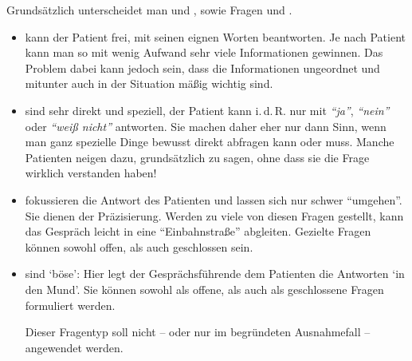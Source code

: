 {
Grundsätzlich unterscheidet man  und
, sowie  Fragen und
.

\begin{itemize}
  \item {} kann der Patient frei, mit
  seinen eignen Worten beantworten. Je nach Patient kann man so
  mit wenig Aufwand sehr viele Informationen gewinnen. Das
  Problem dabei kann jedoch sein, dass die Informationen
  ungeordnet und mitunter auch in der Situation mäßig wichtig
  sind.
  
  \begin{quote}
    
  \end{quote}
  
  
  \item {} sind sehr direkt und
  speziell, der Patient kann i.\,d.\,R. nur mit
  \emph{\enquote{ja}}, \emph{\enquote{nein}} oder
  \emph{\enquote{weiß nicht}} antworten. Sie machen daher
  eher nur dann Sinn, wenn man ganz spezielle Dinge bewusst
  direkt abfragen kann oder muss.  Manche
  Patienten neigen dazu, grundsätzlich  zu
  sagen, ohne dass sie die Frage wirklich verstanden haben!
  
  \begin{quote}
    
  \end{quote}
  
  \item {} fokussieren die Antwort des
  Patienten und
  lassen sich nur schwer \enquote{umgehen}. Sie dienen der
  Präzisierung. Werden zu
  viele von diesen Fragen gestellt, kann das Gespräch leicht
  in eine \enquote{Einbahnstraße} abgleiten. Gezielte Fragen können
  sowohl offen, als auch geschlossen sein.
  \begin{quote}
  \end{quote}
  
  \item {} sind \enquote*{böse}: Hier
  legt der Gesprächsführende dem Patienten die Antworten \enquote*{in
  den Mund}. Sie können sowohl als offene, als auch als
  geschlossene Fragen formuliert werden.
  
  \begin{quote}
    
  \end{quote}
  
  Dieser Fragentyp soll nicht -- oder nur im begründeten
  Ausnahmefall -- angewendet werden.
\end{itemize}



}
